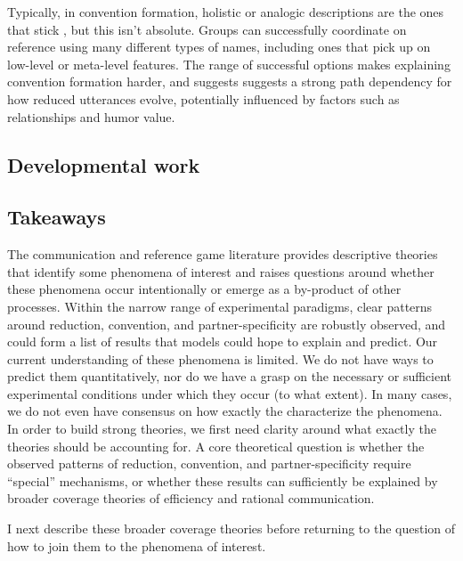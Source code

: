 \documentclass[]{article}
\begin{document}
Typically, in convention formation, holistic or analogic descriptions are the ones that stick \citep{clark1986}, but this isn't absolute. Groups can successfully coordinate on reference using many different types of names, including ones that pick up on low-level or meta-level features. The range of successful options makes explaining convention formation harder, and suggests  suggests a strong path dependency for how reduced utterances evolve, potentially influenced by factors such as relationships and humor value. 

\subsection{Developmental work}



\subsection{Takeaways} 

The communication and reference game literature provides descriptive theories that identify some phenomena of interest and raises questions around whether these phenomena occur intentionally or emerge as a by-product of other processes. Within the narrow range of experimental paradigms, clear patterns around reduction, convention, and partner-specificity are robustly observed, and could form a list of results that models could hope to explain and predict. Our current understanding of these phenomena is limited. We do not have ways to predict them quantitatively, nor do we have a grasp on the necessary or sufficient experimental conditions under which they occur (to what extent). In many cases, we do not even have consensus on how exactly the characterize the phenomena. In order to build strong theories, we first need clarity around what exactly the theories should be accounting for. A core theoretical question is whether the observed patterns of reduction, convention, and partner-specificity require ``special'' mechanisms, or whether these results can sufficiently be explained by broader coverage theories of efficiency and rational communication. 

I next describe these broader coverage theories before returning to the question of how to join them to the phenomena of interest. 


\end{document}
